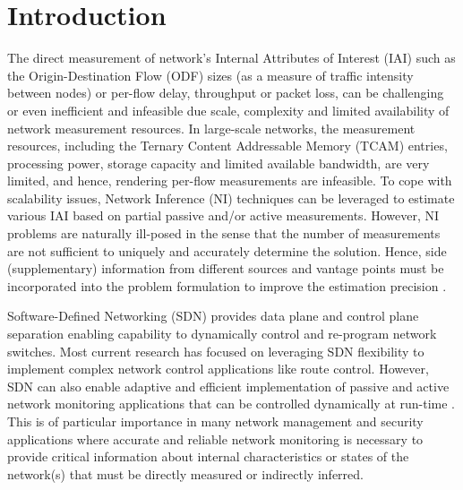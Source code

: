 \section{Introduction}  \label{sec:SNIPERIntro} 

The direct measurement of network's Internal Attributes of Interest
(IAI) such as the Origin-Destination Flow (ODF) sizes (as a measure of
traffic intensity between nodes) or per-flow delay, throughput or
packet loss, can be challenging or even inefficient and infeasible due
scale, complexity and limited availability of network measurement
resources. In large-scale networks, the measurement resources,
including the Ternary Content Addressable Memory (TCAM) entries,
processing power, storage capacity and limited available bandwidth,
are very limited, and hence, rendering per-flow measurements are
infeasible. To cope with scalability issues, Network Inference (NI)
techniques can be leveraged to estimate various IAI based on partial
passive and/or active measurements. However, NI problems are naturally
ill-posed in the sense that the number of measurements are not
sufficient to uniquely and accurately determine the solution. Hence,
side (supplementary) information from different sources and vantage
points must be incorporated into the problem formulation to improve
the estimation precision \cite{QZhao:2006} \cite{MDFE:2013}
\cite{HNguyen:2007}.

Software-Defined Networking (SDN) provides data plane and control
plane separation enabling capability to dynamically control and
re-program network switches. Most current research has focused on
leveraging SDN flexibility to implement complex network control
applications like route control. However, SDN can also enable adaptive
and efficient implementation of passive and active network monitoring
applications that can be controlled dynamically at run-time
\cite{MYu:2011} \cite{MYu:2013} \cite{IF14iSTAMP:2014}
\cite{Adrichen:2014}. This is of particular importance in many network
management and security applications where accurate and reliable
network monitoring is necessary to provide critical information about
internal characteristics or states of the network(s) that must be
directly measured or indirectly inferred.

